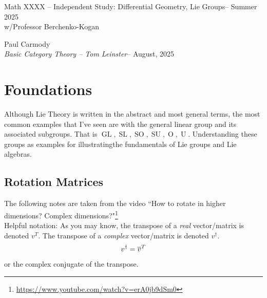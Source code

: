\documentclass[12pt,a4paper]{report}
\newcommand{\CLASSNAME}{Math XXXX -- Independent Study: Differential Geometry, Lie Groups}
\newcommand{\STUDENTNAME}{Paul Carmody}
\newcommand{\ASSIGNMENT}{\textit{Basic Category Theory -- Tom Leinster}}
\newcommand{\DUEDATE}{August, 2025}
\newcommand{\PROFESSOR}{Professor Berchenko-Kogan}
\newcommand{\SEMESTER}{Summer 2025}
\newcommand{\GLG}{\operatorname{GL}}
\newcommand{\SLG}{\operatorname{SL}}
\newcommand{\SOG}{\operatorname{SO}}
\newcommand{\SUG}{\operatorname{SU}}
\newcommand{\OG}{\operatorname{O}}
\newcommand{\UG}{\operatorname{U}}
\begin{document}
\begin{center}
	\Large{\CLASSNAME -- \SEMESTER} \\
	\large{ w/\PROFESSOR}
\end{center}
\begin{center}
	\STUDENTNAME \\
	\ASSIGNMENT -- \DUEDATE\\
\end{center} 

\chapter{Foundations}

Although Lie Theory is written in the abstract and most general terms, the most common examples that I've seen are with the general linear group and its associated subgroups.  That is $\GLG, \SLG, \SOG, \SUG, \OG, \UG$.  Understanding these groups as examples for illustratingthe fundamentals of Lie groups and Lie algebras.\\

\section{Rotation Matrices}

The following notes are taken from the video ``How to rotate in higher dimensions? Complex dimensions?"\footnote{\url{https://www.youtube.com/watch?v=erA0jb9dSm0}}\\

Helpful notation: As you may know, the transpose of a \textit{real} vector/matrix is denoted $v^T$.  The transpose of a \textit{complex} vector/matrix is denoted $v^\dagger$.
\begin{align*}
	v^\dagger = \overline{v}^T
\end{align*}or the complex conjugate of the transpose.
\end{document}
